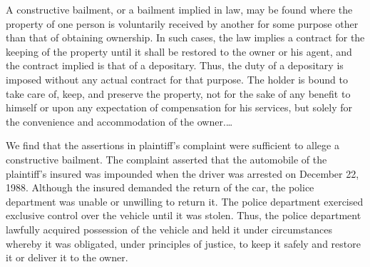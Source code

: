 A constructive bailment, or a bailment implied in law, may be found where the
property of one person is voluntarily received by another for some purpose other
than that of obtaining ownership.
In such cases, the law implies a contract for the keeping of
the property until it shall be restored to the owner or his agent, and the
contract implied is that of a depositary. Thus, the duty of a depositary is
imposed without any actual contract for that purpose.
The holder is bound to take care of, keep,
and preserve the property, not for the sake of any benefit to himself or upon
any expectation of compensation for his services, but solely for the convenience
and accommodation of the owner.\ldots

%

We
find that the assertions in plaintiff's complaint were sufficient to allege a
constructive bailment. The complaint asserted that the automobile of the
plaintiff's insured was impounded when the driver was arrested on December 22,
1988. Although the insured demanded the return of the car, the police department
was unable or unwilling to return it. The police department exercised exclusive
control over the vehicle until it was stolen. Thus, the police department
lawfully acquired possession of the vehicle and held it under circumstances
whereby it was obligated, under principles of justice, to keep it safely and
restore it or deliver it to the owner.


